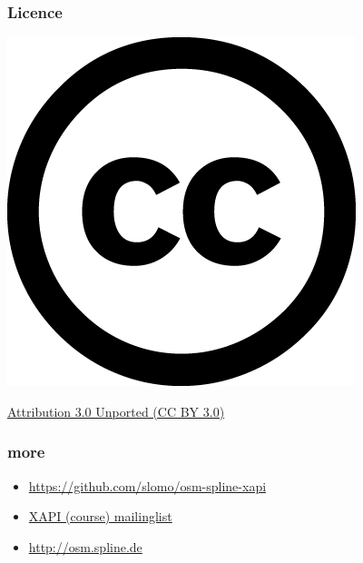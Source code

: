 \documentclass{beamer}
\begin{document}
\begin{frame}[fragile]
    \frametitle{Licence}
    \begin{center}
    \includegraphics[scale=0.25]{./cc.png}
    \end{center}
    \begin{center}
    \href{http://creativecommons.org/licenses/by/3.0/}{Attribution 3.0 Unported (CC BY 3.0)}
    \end{center}
\end{frame}

\begin{frame}[fragile]
    \frametitle{more}
    \begin{itemize}
        \item \url{https://github.com/slomo/osm-spline-xapi}
        \item \href{https://lists.spline.inf.fu-berlin.de/mailman/listinfo/xapi}{XAPI (course) mailinglist}
        \item \url{http://osm.spline.de}
    \end{itemize}
\end{frame}
\end{document}
